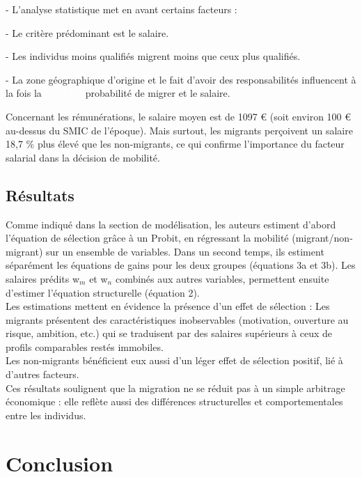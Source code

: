 \documentclass{article}
\begin{document}
\vspace{5pt}

 - L’analyse statistique met en avant certains facteurs :

 - Le critère prédominant est le salaire.

 - Les individus moins qualifiés migrent moins que ceux plus qualifiés.

 - La zone géographique d’origine et le fait d’avoir des responsabilités influencent à la fois la \textcolor{white}{123} \textcolor{white}{1234} probabilité de migrer et le salaire.

 \vspace{5pt}
 
Concernant les rémunérations, le salaire moyen est de 1097 € (soit environ 100 € au-dessus du SMIC de l’époque). Mais surtout, les migrants perçoivent un salaire 18,7 \% plus élevé que les non-migrants, ce qui confirme l’importance du facteur salarial dans la décision de mobilité.

\newpage

\subsection{Résultats}

Comme indiqué dans la section de modélisation, les auteurs estiment d’abord l’équation de sélection grâce à un Probit, en régressant la mobilité (migrant/non-migrant) sur un ensemble de variables. Dans un second temps, ils estiment séparément les équations de gains pour les deux groupes (équations 3a et 3b). Les salaires prédits w$_m$ et w$_n$ combinés aux autres variables, permettent ensuite d’estimer l’équation structurelle (équation 2).\\
Les estimations mettent en évidence la présence d’un effet de sélection :
Les migrants présentent des caractéristiques inobservables (motivation, ouverture au risque, ambition, etc.) qui se traduisent par des salaires supérieurs à ceux de profils comparables restés immobiles.\\
Les non-migrants bénéficient eux aussi d’un léger effet de sélection positif, lié à d’autres facteurs.\\
Ces résultats soulignent que la migration ne se réduit pas à un simple arbitrage économique : elle reflète aussi des différences structurelles et comportementales entre les individus.

\section{Conclusion}
\end{document}
